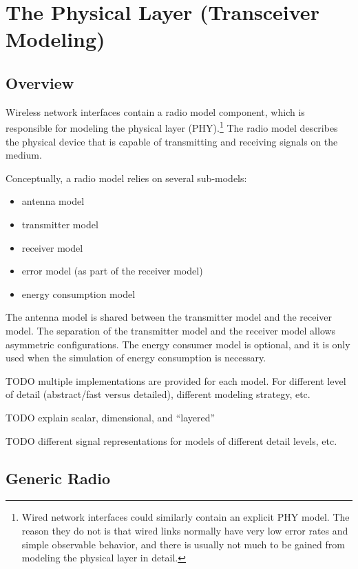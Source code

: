\chapter{The Physical Layer (Transceiver Modeling)}
\label{cha:physicallayer}

\section{Overview}
\label{sec:phy:overview}

Wireless network interfaces contain a radio model component, which is
responsible for modeling the physical layer (PHY).\footnote{Wired network interfaces
could similarly contain an explicit PHY model. The reason they do not is that
wired links normally have very low error rates and simple observable behavior,
and there is usually not much to be gained from modeling the physical layer in detail.}
The radio model describes the physical device that is capable of transmitting
and receiving signals on the medium.

Conceptually, a radio model relies on several sub-models:

\begin{itemize}
  \item antenna model
  \item transmitter model
  \item receiver model
  \item error model (as part of the receiver model)
  \item energy consumption model
\end{itemize}

The antenna model is shared between the transmitter model and the receiver model.
The separation of the transmitter model and the receiver model allows
asymmetric configurations. The energy consumer model is optional, and
it is only used when the simulation of energy consumption is necessary.

TODO multiple implementations are provided for each model. For different
level of detail (abstract/fast versus detailed), different modeling strategy, etc.

TODO explain scalar, dimensional, and ``layered''

TODO different signal representations for models of different detail levels, etc.

\section{Generic Radio}
\label{sec:phy:generic-radio}

